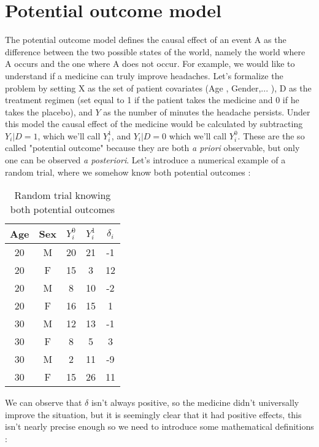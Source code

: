\chapter{Potential outcome model}
\label{chapt:PotentialOM}
The potential outcome model defines the causal effect of an event A as the difference between the two possible states of the world, namely the world where A occurs and the one where A does not occur.
For example, we would like to understand if a medicine can truly improve headaches. Let's formalize the problem by setting X as the set of patient covariates (Age , Gender,... ), D as the treatment regimen (set equal to 1 if the patient takes the medicine and 0 if he takes the placebo), and $Y$ as the number of minutes the headache persists.
Under this model the causal effect of the medicine would be calculated by subtracting $Y_i|D=1$, which we'll call $Y^{1}_i$, and $Y_i|D=0$ which we'll call $Y^{0}_i$. These are the so called "potential outcome" because they are both \textit{a priori} observable, but only one can be observed \textit{a posteriori}. Let's introduce a numerical example of a random trial, where we somehow know both potential outcomes :

\begin{table}[H]
\centering
\begin{tabular}{|c|c|c|c|c|}
\hline
Age & Sex & $Y^{0}_i$ & $Y^{1}_i$ & $\delta_i$ \\ \hline
20 & M & 20 & 21 & -1  \\ \hline
20 & F & 15 & 3 & 12 \\ \hline
20 & M & 8 & 10 & -2 \\ \hline
20 & F & 16 & 15 & 1 \\ \hline
30 & M & 12 & 13 & -1 \\ \hline
30 & F & 8 & 5 & 3 \\ \hline
30 & M & 2 & 11 & -9  \\ \hline
30 & F & 15 & 26 & 11 \\ \hline
\end{tabular}
\caption{Random trial knowing both potential outcomes }
\label{rt_kbpo}
\end{table}

We can observe that $\delta$ isn't always positive, so the medicine didn't universally improve the situation, but it is seemingly clear that it had positive effects, this isn't nearly precise enough so we need to introduce some mathematical definitions :
